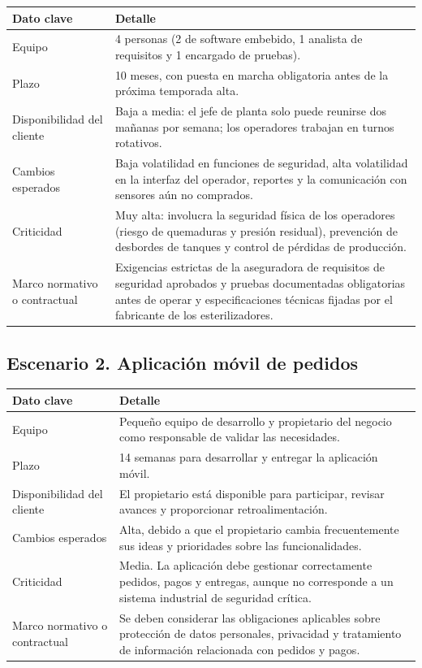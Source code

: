 \documentclass[11pt,a4paper]{article}
\begin{document}
	
	\begin{tabularx}{\textwidth}{|p{4cm}|Y|}
	\hline
	\textbf{Dato clave} & \textbf{Detalle} \\ \hline
	Equipo &
	4 personas (2 de software embebido, 1 analista de requisitos y 1 encargado de pruebas). \\ \hline
	Plazo &
	10 meses, con puesta en marcha obligatoria antes de la próxima temporada alta. \\ \hline
	Disponibilidad del cliente &
	Baja a media: el jefe de planta solo puede reunirse dos mañanas por semana; los operadores trabajan en turnos rotativos. \\ \hline
	Cambios esperados &
	Baja volatilidad en funciones de seguridad, alta volatilidad en la interfaz del operador, reportes y la comunicación con sensores aún no comprados. \\ \hline
	Criticidad &
	Muy alta: involucra la seguridad física de los operadores (riesgo de quemaduras y presión residual), prevención de desbordes de tanques y control de pérdidas de producción. \\ \hline
	Marco normativo o contractual &
	Exigencias estrictas de la aseguradora de requisitos de seguridad aprobados y pruebas documentadas obligatorias antes de operar y especificaciones técnicas fijadas por el fabricante de los esterilizadores. \\ \hline
\end{tabularx}
	
	\subsection{Escenario 2. Aplicación móvil de pedidos}
	
	\begin{tabularx}{\textwidth}{|p{4cm}|Y|}
		\hline
		\textbf{Dato clave} & \textbf{Detalle} \\ \hline
		Equipo &
		Pequeño equipo de desarrollo y propietario del negocio como responsable de validar las necesidades. \\ \hline
		Plazo &
		14 semanas para desarrollar y entregar la aplicación móvil. \\ \hline
		Disponibilidad del cliente &
		El propietario está disponible para participar, revisar avances y proporcionar retroalimentación. \\ \hline
		Cambios esperados &
		Alta, debido a que el propietario cambia frecuentemente sus ideas y prioridades sobre las funcionalidades. \\ \hline
		Criticidad &
		Media. La aplicación debe gestionar correctamente pedidos, pagos y entregas, aunque no corresponde a un sistema industrial de seguridad crítica. \\ \hline
		Marco normativo o contractual &
		Se deben considerar las obligaciones aplicables sobre protección de datos personales, privacidad y tratamiento de información relacionada con pedidos y pagos. \\ \hline
	\end{tabularx}
	
\end{document}
